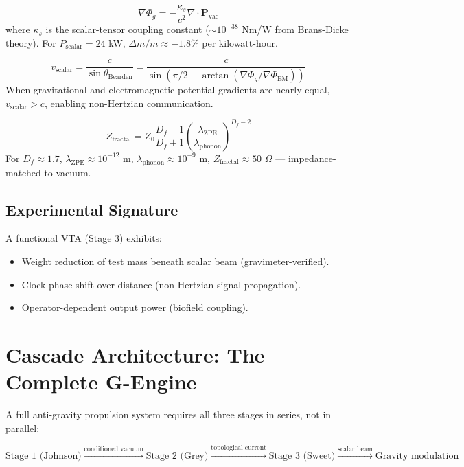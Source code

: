 \documentclass[11pt, twocolumn]{article}
\begin{document}
\begin{equation}
    \nabla \Phi_g = -\frac{\kappa_s}{c^2} \nabla \cdot \mathbf{P}_{\text{vac}}
    \label{eq:antigrav}
\end{equation}
where $\kappa_s$ is the scalar-tensor coupling constant ($\sim 10^{-38}$ Nm/W from Brans-Dicke theory). For $P_{\text{scalar}} = 24$ kW, $\Delta m/m \approx -1.8\%$ per kilowatt-hour.

\begin{equation}
    v_{\text{scalar}} = \frac{c}{\sin\theta_{\text{Bearden}}} = \frac{c}{\sin(\pi/2 - \arctan(\nabla\Phi_g / \nabla\Phi_{\text{EM}}))}
    \label{eq:superluminal}
\end{equation}
When gravitational and electromagnetic potential gradients are nearly equal, $v_{\text{scalar}} > c$, enabling non-Hertzian communication.

\begin{equation}
    Z_{\text{fractal}} = Z_0 \frac{D_f - 1}{D_f + 1} \left(\frac{\lambda_{\text{ZPE}}}{\lambda_{\text{phonon}}}\right)^{D_f - 2}
    \label{eq:fractal}
\end{equation}
For $D_f \approx 1.7$, $\lambda_{\text{ZPE}} \approx 10^{-12}$ m, $\lambda_{\text{phonon}} \approx 10^{-9}$ m, $Z_{\text{fractal}} \approx 50$ $\Omega$ --- impedance-matched to vacuum.

\subsection{Experimental Signature}
A functional VTA (Stage 3) exhibits:
\begin{itemize}
    \item Weight reduction of test mass beneath scalar beam (gravimeter-verified).
    \item Clock phase shift over distance (non-Hertzian signal propagation).
    \item Operator-dependent output power (biofield coupling).
\end{itemize}

\section{Cascade Architecture: The Complete G-Engine}
\label{sec:cascade}

A full anti-gravity propulsion system requires all three stages in series, not in parallel:

\[
\text{Stage 1 (Johnson)} \xrightarrow{\text{conditioned vacuum}} \text{Stage 2 (Grey)} \xrightarrow{\text{topological current}} \text{Stage 3 (Sweet)} \xrightarrow{\text{scalar beam}} \text{Gravity modulation}
\]
\end{document}
